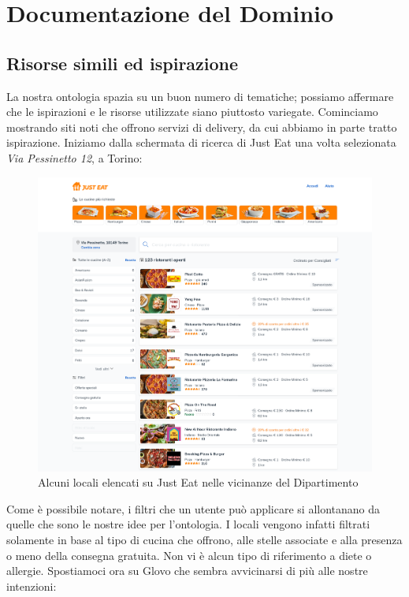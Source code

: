 \documentclass[12pt]{article}
\begin{document}
\newpage
\section{Documentazione del Dominio}
\subsection{Risorse simili ed ispirazione}
La nostra ontologia spazia su un buon numero di tematiche; possiamo affermare che le ispirazioni e le risorse utilizzate siano piuttosto variegate.
\newline
Cominciamo mostrando siti noti che offrono servizi di delivery, da cui abbiamo in parte tratto ispirazione. Iniziamo dalla schermata di ricerca di Just Eat una volta selezionata \textit{Via Pessinetto 12}, a Torino:
\begin{figure}[H]
    \centering
    \includegraphics[width=12cm]{files/justEat.png}
    \caption{Alcuni locali elencati su Just Eat nelle vicinanze del Dipartimento}
\end{figure}
Come è possibile notare, i filtri che un utente può applicare si allontanano da quelle che sono le nostre idee per l'ontologia. I locali vengono infatti filtrati solamente in base al tipo di cucina che offrono, alle stelle associate e alla presenza o meno della consegna gratuita. Non vi è alcun tipo di riferimento a diete o allergie.\newline
Spostiamoci ora su Glovo che sembra avvicinarsi di più alle nostre intenzioni:
\end{document}
